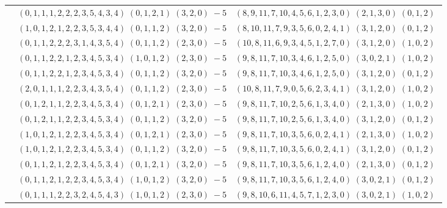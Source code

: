 \documentclass[11pt]{article}
\begin{document}
\begin{longtable}[l]{|c|c|c|}
 \cline{2-3} 
 & $(0 ,1 ,1 ,1 ,2 ,2 ,2 ,3 ,5 ,4 ,3 ,4) \;(0 ,1 ,2 ,1) \;(3 ,2 ,0) \;-5$ & $(8 ,9 ,11 ,7 ,10 ,4 ,5 ,6 ,1 ,2 ,3 ,0) \;(2 ,1 ,3 ,0) \;(0 ,1 ,2) \;$\\ 
 \cline{2-3} 
 & $(1 ,0 ,1 ,2 ,1 ,2 ,2 ,3 ,5 ,3 ,4 ,4) \;(0 ,1 ,1 ,2) \;(3 ,2 ,0) \;-5$ & $(8 ,10 ,11 ,7 ,9 ,3 ,5 ,6 ,0 ,2 ,4 ,1) \;(3 ,1 ,2 ,0) \;(0 ,1 ,2) \;$\\ 
 \cline{2-3} 
 & $(0 ,1 ,1 ,2 ,2 ,2 ,3 ,1 ,4 ,3 ,5 ,4) \;(0 ,1 ,1 ,2) \;(2 ,3 ,0) \;-5$ & $(10 ,8 ,11 ,6 ,9 ,3 ,4 ,5 ,1 ,2 ,7 ,0) \;(3 ,1 ,2 ,0) \;(1 ,0 ,2) \;$\\ 
 \cline{2-3} 
 & $(0 ,1 ,1 ,2 ,2 ,1 ,2 ,3 ,4 ,5 ,3 ,4) \;(1 ,0 ,1 ,2) \;(2 ,3 ,0) \;-5$ & $(9 ,8 ,11 ,7 ,10 ,3 ,4 ,6 ,1 ,2 ,5 ,0) \;(3 ,0 ,2 ,1) \;(1 ,0 ,2) \;$\\ 
 \cline{2-3} 
 & $(0 ,1 ,1 ,2 ,2 ,1 ,2 ,3 ,4 ,5 ,3 ,4) \;(0 ,1 ,1 ,2) \;(3 ,2 ,0) \;-5$ & $(9 ,8 ,11 ,7 ,10 ,3 ,4 ,6 ,1 ,2 ,5 ,0) \;(3 ,1 ,2 ,0) \;(0 ,1 ,2) \;$\\ 
 \cline{2-3} 
 & $(2 ,0 ,1 ,1 ,1 ,2 ,2 ,3 ,4 ,3 ,5 ,4) \;(0 ,1 ,1 ,2) \;(2 ,3 ,0) \;-5$ & $(10 ,8 ,11 ,7 ,9 ,0 ,5 ,6 ,2 ,3 ,4 ,1) \;(3 ,1 ,2 ,0) \;(1 ,0 ,2) \;$\\ 
 \cline{2-3} 
 & $(0 ,1 ,2 ,1 ,1 ,2 ,2 ,3 ,4 ,5 ,3 ,4) \;(0 ,1 ,2 ,1) \;(2 ,3 ,0) \;-5$ & $(9 ,8 ,11 ,7 ,10 ,2 ,5 ,6 ,1 ,3 ,4 ,0) \;(2 ,1 ,3 ,0) \;(1 ,0 ,2) \;$\\ 
 \cline{2-3} 
 & $(0 ,1 ,2 ,1 ,1 ,2 ,2 ,3 ,4 ,5 ,3 ,4) \;(0 ,1 ,1 ,2) \;(3 ,2 ,0) \;-5$ & $(9 ,8 ,11 ,7 ,10 ,2 ,5 ,6 ,1 ,3 ,4 ,0) \;(3 ,1 ,2 ,0) \;(0 ,1 ,2) \;$\\ 
 \cline{2-3} 
 & $(1 ,0 ,1 ,2 ,1 ,2 ,2 ,3 ,4 ,5 ,3 ,4) \;(0 ,1 ,2 ,1) \;(2 ,3 ,0) \;-5$ & $(9 ,8 ,11 ,7 ,10 ,3 ,5 ,6 ,0 ,2 ,4 ,1) \;(2 ,1 ,3 ,0) \;(1 ,0 ,2) \;$\\ 
 \cline{2-3} 
 & $(1 ,0 ,1 ,2 ,1 ,2 ,2 ,3 ,4 ,5 ,3 ,4) \;(0 ,1 ,1 ,2) \;(3 ,2 ,0) \;-5$ & $(9 ,8 ,11 ,7 ,10 ,3 ,5 ,6 ,0 ,2 ,4 ,1) \;(3 ,1 ,2 ,0) \;(0 ,1 ,2) \;$\\ 
 \cline{2-3} 
 & $(0 ,1 ,1 ,2 ,1 ,2 ,2 ,3 ,4 ,5 ,3 ,4) \;(0 ,1 ,2 ,1) \;(3 ,2 ,0) \;-5$ & $(9 ,8 ,11 ,7 ,10 ,3 ,5 ,6 ,1 ,2 ,4 ,0) \;(2 ,1 ,3 ,0) \;(0 ,1 ,2) \;$\\ 
 \cline{2-3} 
 & $(0 ,1 ,1 ,2 ,1 ,2 ,2 ,3 ,4 ,5 ,3 ,4) \;(1 ,0 ,1 ,2) \;(3 ,2 ,0) \;-5$ & $(9 ,8 ,11 ,7 ,10 ,3 ,5 ,6 ,1 ,2 ,4 ,0) \;(3 ,0 ,2 ,1) \;(0 ,1 ,2) \;$\\ 
 \cline{2-3} 
 & $(0 ,1 ,1 ,1 ,2 ,2 ,3 ,2 ,4 ,5 ,4 ,3) \;(1 ,0 ,1 ,2) \;(2 ,3 ,0) \;-5$ & $(9 ,8 ,10 ,6 ,11 ,4 ,5 ,7 ,1 ,2 ,3 ,0) \;(3 ,0 ,2 ,1) \;(1 ,0 ,2) \;$\\ 

\end{longtable}
\end{document}
